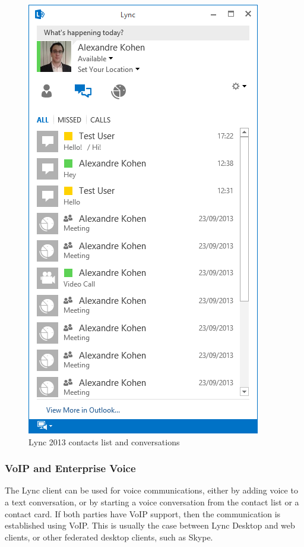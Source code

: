 \begin{figure}
\begin{minipage}[c]{.3\linewidth}
		\includegraphics[width=\textwidth]{Schemas/conversations.png}
	\end{minipage}

   	\caption{Lync 2013 contacts list and conversations}
\end{figure}

\subsubsection{VoIP and Enterprise Voice}
The Lync client can be used for voice communications, either by adding voice to a text conversation, or by starting a voice conversation from the contact list or a contact card. If both parties have VoIP support, then the communication is established using VoIP. This is usually the case between Lync Desktop and web clients, or other federated desktop clients, such as Skype.

